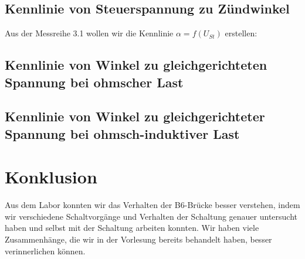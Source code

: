 \documentclass{article}
\begin{document}
\subsection{Kennlinie von Steuerspannung zu Zündwinkel}
\label{sec:kennl-von-steu}

Aus der Messreihe 3.1 wollen wir die Kennlinie $\alpha = f(U_{St})$ erstellen:


\subsection{Kennlinie von Winkel zu gleichgerichteten Spannung bei ohmscher Last}
\label{sec:kennlinie-von-winkel}


\subsection{Kennlinie von Winkel zu gleichgerichteter Spannung bei ohmsch-induktiver Last}
\label{sec:kennlinie-von-winkel-1}



\section{Konklusion}
\label{sec:konklusion}

Aus dem Labor konnten wir das Verhalten der B6-Brücke besser verstehen, indem wir verschiedene Schaltvorgänge und Verhalten der Schaltung genauer untersucht haben und selbst mit der Schaltung arbeiten konnten. Wir haben viele Zusammenhänge, die wir in der Vorlesung bereits behandelt haben, besser verinnerlichen können.
\end{document}
